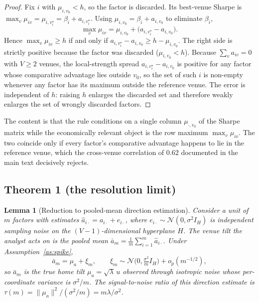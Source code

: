 \documentclass[12pt]{article}
\theoremstyle{plain}
\newtheorem{lemma}{Lemma}
\theoremstyle{definition}
\begin{document}
\begin{proof}
Fix $i$ with $\mu_{i,v_0}<h$, so the factor is discarded. Its best-venue Sharpe
is $\max_v\mu_{iv}=\mu_{i,v^\star_i}=\beta_i+a_{i,v^\star_i}$. Using
$\mu_{i,v_0}=\beta_i+a_{i,v_0}$ to eliminate $\beta_i$,
\[
\max_v\mu_{iv}=\mu_{i,v_0}+\bigl(a_{i,v^\star_i}-a_{i,v_0}\bigr).
\]
Hence $\max_v\mu_{iv}\ge h$ if and only if $a_{i,v^\star_i}-a_{i,v_0}\ge
h-\mu_{i,v_0}$. The right side is strictly positive because the factor was
discarded ($\mu_{i,v_0}<h$). Because $\sum_v a_{iv}=0$ with $V\ge 2$ venues, the
local-strength spread $a_{i,v^\star_i}-a_{i,v_0}$ is positive for any factor
whose comparative advantage lies outside $v_0$, so the set of such $i$ is
non-empty whenever any factor has its maximum outside the reference venue. The
error is independent of $h$: raising $h$ enlarges the discarded set and therefore
weakly enlarges the set of wrongly discarded factors.
\end{proof}

\noindent The content is that the rule conditions on a single column
$\mu_{\cdot,v_0}$ of the Sharpe matrix while the economically relevant object is
the row maximum $\max_v\mu_{iv}$. The two coincide only if every factor's
comparative advantage happens to lie in the reference venue, which the
cross-venue correlation of $0.62$ documented in the main text decisively rejects.

\subsection{Theorem 1 (the resolution limit)}

\begin{lemma}[Reduction to pooled-mean direction estimation]
\label{lem:spike}
Consider a unit of $m$ factors with estimates $\hat a_{i\cdot}=a_{i\cdot}
+e_{i\cdot}$, where $e_{i\cdot}\sim\mathcal N(0,\sigma^2 I_H)$ is independent
sampling noise on the $(V-1)$-dimensional hyperplane $H$. The venue tilt the
analyst acts on is the pooled mean $\bar a_m=\tfrac1m\sum_{i=1}^m\hat a_{i\cdot}$.
Under Assumption~\ref{as:spike},
\[
\bar a_m=\mu_a+\xi_m,\qquad
\xi_m\sim\mathcal N\!\bigl(0,\tfrac{\sigma^2}{m}I_H\bigr)+o_p(m^{-1/2}),
\]
so $\bar a_m$ is the true home tilt $\mu_a=\sqrt{\lambda}\,u$ observed through
isotropic noise whose per-coordinate variance is $\sigma^2/m$. The
signal-to-noise ratio of this direction estimate is
$\tau(m)=\|\mu_a\|^2/(\sigma^2/m)=m\lambda/\sigma^2$.
\end{lemma}
\end{document}
